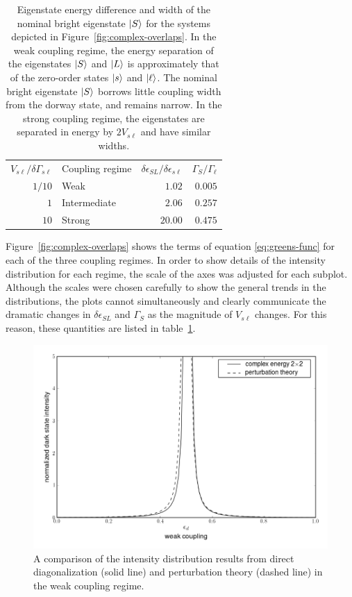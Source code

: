 \begin{table}
  \caption{Eigenstate energy difference and width of the nominal
    bright eigenstate $\mathinner{|{S}\rangle}$ for the systems depicted in 
    Figure~\ref{fig:complex-overlaps}.  In the weak coupling regime, 
    the energy separation of the eigenstates $\mathinner{|{S}\rangle}$ and $\mathinner{|{L}\rangle}$ 
    is approximately that of the zero-order states $\mathinner{|{s}\rangle}$ and 
    $\mathinner{|{\ell}\rangle}$.  The nominal bright eigenstate $\mathinner{|{S}\rangle}$ borrows 
    little coupling width from the dorway state, and remains narrow.
    In the strong coupling regime, the eigenstates are
    separated in energy by $2V_{s\ell}$ and have similar widths.}
  \label{table:complex-int-params}
  \centering
  \begin{tabular}{rlrr}
    & \\
    \toprule
    $V_{s\ell} / \delta \Gamma_{s\ell}$ & Coupling regime & $\delta
    \epsilon_{SL} / \delta \epsilon_{s\ell}$ & $\Gamma_S / \Gamma_{\ell}$ \\
    \midrule
    $1/10$ & Weak & $1.02$ & $0.005$ \\
    $1$ & Intermediate & $2.06$ & $0.257$ \\
    $10$ & Strong & $20.00$ & $0.475$ \\
    \bottomrule
  \end{tabular}
\end{table}
Figure~\ref{fig:complex-overlaps} shows the terms of equation
\ref{eq:greens-func} for each of the three coupling regimes. In order
to show details of the intensity distribution for each regime, the
scale of the axes was adjusted for each subplot. Although the scales
were chosen carefully to show the general trends in the distributions,
the plots cannot simultaneously and clearly communicate the
dramatic changes in $\delta \epsilon_{SL}$ and $\Gamma_S$ as the
magnitude of $V_{s\ell}$ changes. For this reason, these quantities
are listed in table~\ref{table:complex-int-params}.

\begin{figure}
  \caption{A comparison of the intensity distribution results from
    direct diagonalization (solid line) and perturbation theory
    (dashed line) in the weak coupling regime.}
  \label{fig:complex-compare-weak}
  \centering
  \includegraphics[width=6in]{complex-compare-weak.png}
\end{figure}

